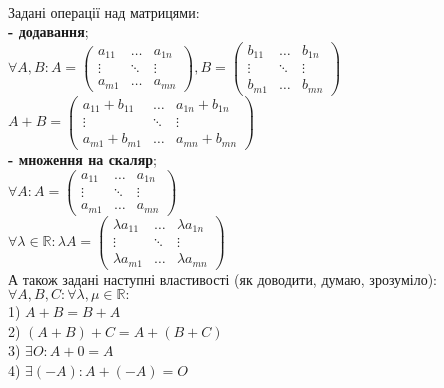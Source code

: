 \documentclass[a4paper, 10pt]{article}
\theoremstyle{theoremdd}
\begin{document}
    	\bigskip \\
    	 Задані операції над матрицями:\\
    	\textbf{- додавання};\\
    	$\forall A,B: A = \begin{pmatrix}
    	a_{11} & \dots & a_{1n} \\
    	\vdots & \ddots & \vdots \\
    	a_{m1} & \dots & a_{mn}
    	\end{pmatrix}, B = \begin{pmatrix}
    	b_{11} & \dots & b_{1n} \\
    	\vdots & \ddots & \vdots \\
    	b_{m1} & \dots & b_{mn}
    	\end{pmatrix}$\\
    	$A + B = \begin{pmatrix}
    	a_{11}+b_{11} & \dots & a_{1n} + b_{1n} \\
    	\vdots & \ddots & \vdots \\
    	a_{m1}+b_{m1} & \dots & a_{mn} + b_{mn}
    	\end{pmatrix}$
    	\bigskip \\
    	\textbf{- множення на скаляр};\\
    	$\forall A: A = \begin{pmatrix}
    	a_{11} & \dots & a_{1n} \\
    	\vdots & \ddots & \vdots \\
    	a_{m1} & \dots & a_{mn}
    	\end{pmatrix}$\\
    	$\forall \lambda \in \mathbb{R}: \lambda A = \begin{pmatrix}
    	\lambda a_{11} & \dots & \lambda a_{1n} \\
    	\vdots & \ddots & \vdots \\
    	\lambda a_{m1} & \dots & \lambda a_{mn}
    	\end{pmatrix}$
    	\bigskip \\
    	А також задані наступні властивості (як доводити, думаю, зрозуміло):\\
    	$\forall A,B,C: \forall \lambda,\mu \in \mathbb{R}:$\\
    	1) $A + B = B + A$\\
	2) $(A + B) + C = A + (B + C)$\\
	3) $\exists O: A + 0 = A$\\
	4) $\exists (-A): A + (-A) = O$\\
\end{document}
